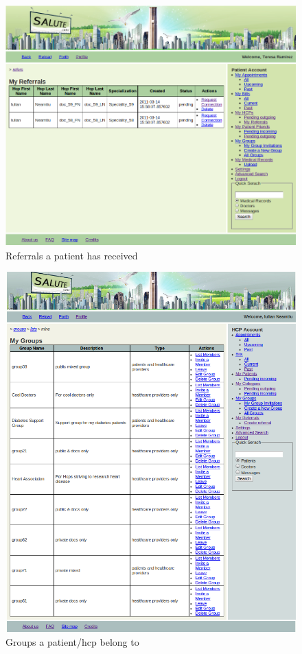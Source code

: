 \begin{figure}
\includegraphics[scale=0.5]{screenshots/patient_my_referral.png}
\caption{Referrals a patient has received}
\end{figure}

\begin{figure}
\includegraphics[scale=0.5]{screenshots/my_groups.png}
\caption{Groups a patient/hcp belong to}
\end{figure}

